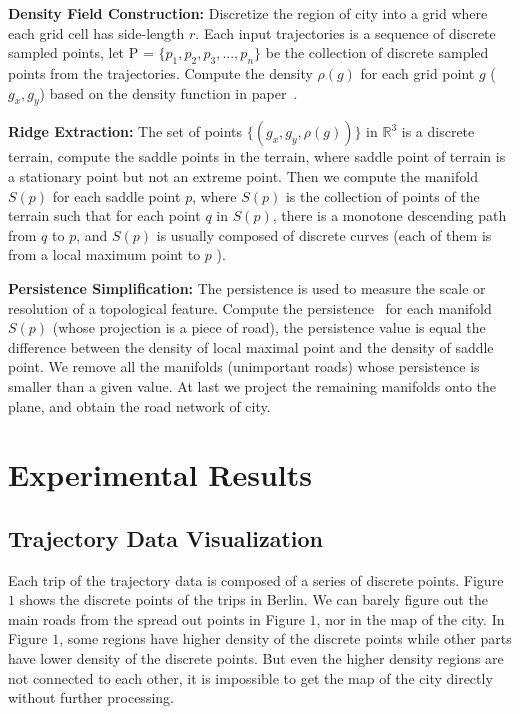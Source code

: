 \documentclass[11pt]{article}
\begin{document}
\par
 \textbf{Density Field Construction:} Discretize the region of city into a
grid where each grid cell has side-length $r$. Each input trajectories is a sequence of discrete  sampled points,  let P = $\{p_1,p_2,p_3,...,p_n\}$ be the collection of discrete sampled points
from the trajectories. Compute the density $\rho(g)$ for  each grid point $g$ ($g_x,g_y$) based on the density function in paper~\cite{Wang15}.
\par
\textbf{Ridge Extraction:} The set of points $\{(g_x,g_y,\rho(g)) \}$ in $\mathbb{R}^3$ is a discrete terrain, compute the saddle points in the terrain, where saddle point of terrain is a stationary point but not an extreme point. Then we compute the 
manifold $S(p)$ for each saddle point $p$, where $S(p)$  is the collection
of points of the terrain such that for each point $q$ in $S(p)$, there is a  monotone  descending path from $q$ to $p$, and $S(p)$ is usually composed of  discrete curves (each of them is from a local maximum point to $p$ ).
\par
\textbf{Persistence Simplification:} The persistence is used to measure the scale or
resolution of a topological feature. Compute the persistence~\cite{edelsbrunner2008persistent} for each manifold $S(p)$ (whose projection is a piece of  road), the persistence value is equal the difference between the density of  local maximal point and the density of saddle point. We remove all the  manifolds
(unimportant roads) whose persistence is smaller than a given value. At last we project the remaining manifolds onto the plane, and obtain the road network of city.



\section*{Experimental Results}


\subsection*{Trajectory Data  Visualization}
Each trip of the trajectory data is composed of a series of discrete points. Figure $1$ shows the discrete points of the trips in Berlin. We can barely figure out the main roads from the spread out points in Figure $1$, nor in the map of the city. In Figure $1$, some regions have higher density of the discrete points while other parts have lower density of the discrete points. But even the higher density regions are not connected to each other, it is impossible to get the map of the city directly without further processing. 
\end{document}
